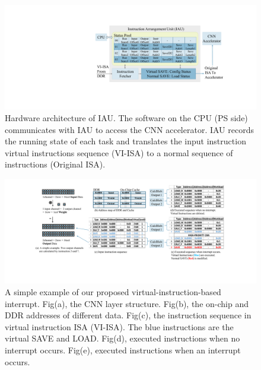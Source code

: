 \begin{figure}[t]
	\centering
	\includegraphics[width=0.99\linewidth]{fig/iau.pdf}
	\vspace{-6mm}
	\caption{Hardware architecture of IAU. The software on the CPU (PS side) communicates with IAU to access the CNN accelerator. IAU records the running state of each task and translates the input instruction virtual instructions sequence (VI-ISA) to a normal sequence of instructions (Original ISA).
	}
	\label{fig:IAU}
\end{figure}
\begin{figure}[t]
	\centering
	\includegraphics[width=0.9\linewidth]{fig/interexample.pdf}
	\vspace{-5mm}
	\caption{ A simple example of our proposed virtual-instruction-based interrupt. Fig(a), the CNN layer structure. Fig(b), the on-chip and DDR addresses of different data. Fig(c), the instruction sequence in virtual instruction ISA (VI-ISA). The blue instructions are the virtual SAVE and LOAD. Fig(d), executed instructions when no interrupt occurs. Fig(e), executed instructions when an interrupt occurs. }
	\label{fig:interexample}
\end{figure}


